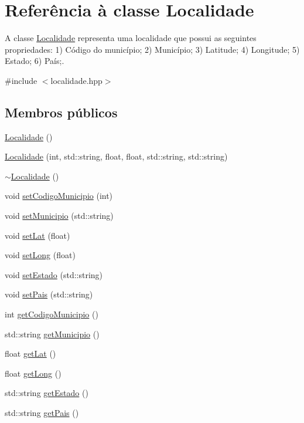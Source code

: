 \hypertarget{classLocalidade}{}\section{Referência à classe Localidade}
\label{classLocalidade}


A classe \hyperlink{classLocalidade}{Localidade} representa uma localidade que possui as seguintes propriedades\+: 1) Código do município; 2) Município; 3) Latitude; 4) Longitude; 5) Estado; 6) País;.  




{\ttfamily \#include $<$localidade.\+hpp$>$}

\subsection*{Membros públicos}
\begin{DoxyCompactItemize}
\item 
\hyperlink{classLocalidade_ae06850bc156d0e7fdc9b04b0a64d14bf}{Localidade} ()
\item 
\hyperlink{classLocalidade_afba433c839d548dac5a04b3ff5e90082}{Localidade} (int, std\+::string, float, float, std\+::string, std\+::string)
\item 
\hyperlink{classLocalidade_ab4bdecea35fe8bd89b67b6d505b8bae1}{$\sim$\+Localidade} ()
\item 
void \hyperlink{classLocalidade_a38bb0027272b4b39b88698dc5820fbc6}{set\+Codigo\+Municipio} (int)
\item 
void \hyperlink{classLocalidade_a90ac71109a4954863bb045a57e3fc29d}{set\+Municipio} (std\+::string)
\item 
void \hyperlink{classLocalidade_af9abc70199d4f50cd90add07c6d6e617}{set\+Lat} (float)
\item 
void \hyperlink{classLocalidade_a9b5f805c802337480712bf010669ced8}{set\+Long} (float)
\item 
void \hyperlink{classLocalidade_a71acb8cadaee73dbdf27a244cc9d5135}{set\+Estado} (std\+::string)
\item 
void \hyperlink{classLocalidade_af8e89f3bdcf8dd7bb1f3f74fdc8bc119}{set\+Pais} (std\+::string)
\item 
int \hyperlink{classLocalidade_af83a061d36464f5d91fefa5b68206112}{get\+Codigo\+Municipio} ()
\item 
std\+::string \hyperlink{classLocalidade_afd2127dad81d3131016f1dd4bcb9823b}{get\+Municipio} ()
\item 
float \hyperlink{classLocalidade_a1548cf9f09eca346af5bdcc4c6f222b6}{get\+Lat} ()
\item 
float \hyperlink{classLocalidade_a97a3f7eabe1cf45e3f0bed721d4641d4}{get\+Long} ()
\item 
std\+::string \hyperlink{classLocalidade_a3e32ae1802d8bd09568599f5133028d3}{get\+Estado} ()
\item 
std\+::string \hyperlink{classLocalidade_a03249330040cf75b6a964cced77526cf}{get\+Pais} ()
\end{DoxyCompactItemize}


